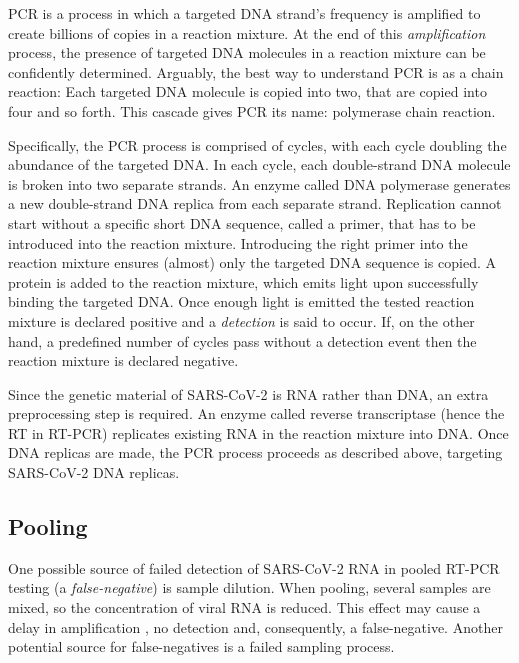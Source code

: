 \documentclass{article}
\begin{document}
PCR is a process in which a targeted DNA strand's frequency is
amplified to create billions of copies in a reaction mixture. At the
end of this \emph{amplification} process, the presence of targeted DNA
molecules in a reaction mixture can be confidently
determined. Arguably, the best way to understand PCR is as a chain
reaction: Each targeted DNA molecule is copied into two, that are
copied into four and so forth. This cascade gives PCR its name:
polymerase chain reaction.

Specifically, the PCR process is comprised of cycles, with each cycle
doubling the abundance of the targeted DNA. In each cycle, each
double-strand DNA molecule is broken into two separate strands. An
enzyme called DNA polymerase generates a new double-strand DNA replica
from each separate strand. Replication cannot start without a specific
short DNA sequence, called a primer, that has to be introduced into
the reaction mixture. Introducing the right primer into the reaction
mixture ensures (almost) only the targeted DNA sequence is copied. A
protein is added to the reaction mixture, which emits light upon
successfully binding the targeted DNA. Once enough light is emitted
the tested reaction mixture is declared positive and a
\emph{detection} is said to occur. If, on the other hand, a predefined
number of cycles pass without a detection event then the reaction
mixture is declared negative.

Since the genetic material of SARS-CoV-2 is RNA rather than DNA, an
extra preprocessing step is required. An enzyme called reverse
transcriptase (hence the RT in RT-PCR) replicates existing RNA in the
reaction mixture into DNA. Once DNA replicas are made, the PCR process
proceeds as described above, targeting SARS-CoV-2 DNA replicas.

\subsection{Pooling}
One possible source of failed detection of SARS-CoV-2 RNA in pooled
RT-PCR testing (a \emph{false-negative}) is sample dilution. When
pooling, several samples are mixed, so the concentration of viral RNA
is reduced. This effect may cause a delay in amplification
\cite{DorfmanYuvalDor}, no detection and, consequently, a
false-negative. Another potential source for false-negatives is a
failed sampling process. 

\end{document}
